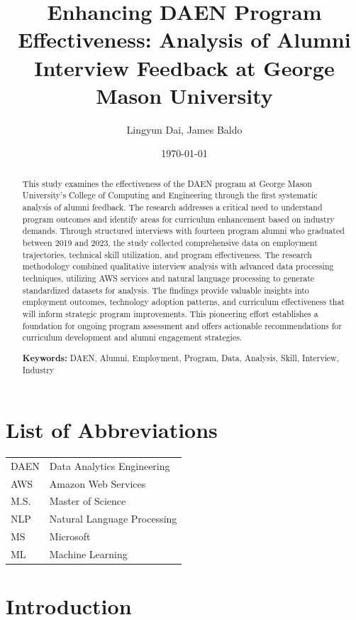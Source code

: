 \documentclass[12pt,a4paper]{article}
\title{\textbf{Enhancing DAEN Program Effectiveness: Analysis of Alumni Interview Feedback at George Mason University}}
\author{Lingyun Dai, James Baldo}
\date{\today}
\begin{document}
\maketitle

\begin{abstract}
This study examines the effectiveness of the DAEN program at George Mason University's College of Computing and Engineering through the first systematic analysis of alumni feedback. The research addresses a critical need to understand program outcomes and identify areas for curriculum enhancement based on industry demands. Through structured interviews with fourteen program alumni who graduated between 2019 and 2023, the study collected comprehensive data on employment trajectories, technical skill utilization, and program effectiveness.
The research methodology combined qualitative interview analysis with advanced data processing techniques, utilizing AWS services and natural language processing to generate standardized datasets for analysis. The findings provide valuable insights into employment outcomes, technology adoption patterns, and curriculum effectiveness that will inform strategic program improvements. This pioneering effort establishes a foundation for ongoing program assessment and offers actionable recommendations for curriculum development and alumni engagement strategies.

\vspace{12pt}
\textbf{Keywords:} DAEN, Alumni, Employment, Program, Data, Analysis, Skill, Interview, Industry
\end{abstract}

\newpage
\tableofcontents
\newpage

\section*{List of Abbreviations}
\begin{tabular}{ll}
DAEN & Data Analytics Engineering\\
AWS & Amazon Web Services\\
M.S. & Master of Science\\
NLP & Natural Language Processing\\
MS & Microsoft\\
ML & Machine Learning\\
\end{tabular}
\newpage

\section{Introduction}
\end{document}
